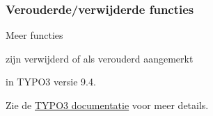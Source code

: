 \begin{frame}[fragile]
	\frametitle{Verouderde/verwijderde functies}

	\vspace{0.6cm}
	\begin{center}
		Meer functies
	\end{center}
	\vspace{-0.8cm}
	\begin{center}
		zijn verwijderd of als verouderd aangemerkt
	\end{center}
	\vspace{-0.8cm}
	\begin{center}
		in TYPO3 versie 9.4.
	\end{center}
	\vspace{-0.6cm}
	\begin{center}
		Zie de \href{https://docs.typo3.org/typo3cms/extensions/core/latest/Changelog/9.4/Index.html#deprecation}{TYPO3 documentatie} voor meer details.
	\end{center}

\end{frame}


